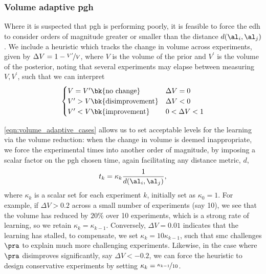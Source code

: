 \subsubsection{Volume adaptive \gls{pgh}}
Where it is suspected that \gls{pgh} is performing poorly, it is feasible to force the \gls{edh} to consider orders of magnitude 
    greater or smaller than the distance $d(\al_i, \al_j)$.
We include a heuristic which tracks the change in \gls{volume} across experiments, 
    given by $\Delta V = 1 - \nicefrac{V^{\prime}}{V}$, where $V$ is the \gls{volume} of the prior
    and $V^{\prime}$ is the \gls{volume} of the posterior, 
    noting that several experiments may elapse between measuring $V, V^{\prime}$,
    such that we can interpret
\begin{align}
    \label{eqn:volume_adaptive_cases}
    \begin{cases}
        V = V^{\prime} \bk{ \textrm{no change} }  & \Delta V = 0   \\
        V^{\prime} > V  \bk{ \textrm{disimprovement} }  & \Delta V < 0  \\ 
        V^{\prime} < V \bk{ \textrm{improvement} }   & 0 < \Delta V < 1\\ 
    \end{cases}
\end{align}

\cref{eqn:volume_adaptive_cases} allows us to set acceptable levels for the learning via the \gls{volume} reduction: 
    when the change in \gls{volume} is deemed inappropriate, we force the experimental times into another order of magnitude, 
    by imposing a scalar factor on the \gls{pgh} chosen time, again facilitating any distance metric, $d$, 
\begin{equation}
    \label{eqn:volume_adaptive_pgh}
    t_k = \kappa_k \frac{1}{d(\al_i, \al_j)},
\end{equation}
    where $\kappa_k$ is a scalar set for each experiment $k$, initially set as $\kappa_0=1$.
For example, if $\Delta V > 0.2$ across a small number of experiments (say 10), 
    we see that the \gls{volume} has reduced by $20\%$ over 10 experiments, which is a strong rate of learning, 
    so we retain $\kappa_k = \kappa_{k-1}$. 
Conversely, $\Delta V = 0.01$ indicates that the learning has stalled, 
    to compensate, we set $\kappa_{k} = 10 \kappa_{k-1}$, 
    such that \gls{smc} challenges $\pra$ to explain much more challenging experiments.
Likewise, in the case where $\pra$ disimproves significantly, say $\Delta V < -0.2$, 
    we can force the heuristic to design conservative experiments by setting $\kappa_k = \nicefrac{\kappa_{k-1}}{10}$. 

